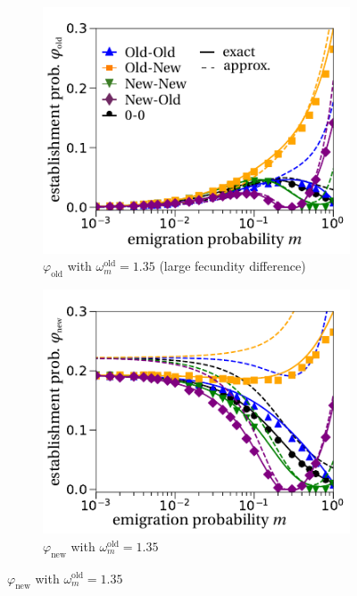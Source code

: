 \documentclass[a4paper,11pt]{scrartcl}
\begin{document}
\begin{figure}[h!]
	\centering
	\begin{subfigure}{.5\textwidth}
  		\centering
  		\includegraphics[width=\linewidth]{figS6a.pdf}
  		\caption{$\varphi_{\text{old}}$ with $\omega^\text{old}_m=1.35$ (large fecundity difference)}
	\end{subfigure}%
	\begin{subfigure}{.5\textwidth}
 		 \centering
 		 \includegraphics[width=\linewidth]{figS6b.pdf}
  	\caption{$\varphi_{\text{new}}$ with $\omega^\text{old}_m=1.35$}
	\end{subfigure}

\end{figure}
\end{document}
